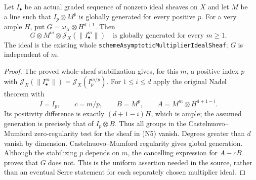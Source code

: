 \begin{corollary}
\label{cor:kn-nadel-asymptotic-uniform-generation}
\notready
Let $I_\bullet$ be an actual graded sequence of nonzero ideal sheaves
on $X$ and let $M$ be a line such that $I_p\otimes M^p$ is globally
generated for every positive $p$.  For a very ample $H$, put
$G=\omega_X\otimes H^{d+1}$.  Then
\[
 G\otimes M^m\otimes\mathcal J_X(\|I_\bullet^m\|)
 \quad\text{is globally generated for every }m\geq1.
 \tag{N5}
\]
The ideal is the existing whole
\texttt{schemeAsymptoticMultiplierIdealSheaf}; $G$ is independent
of $m$.
\end{corollary}
\begin{proof}
The proved whole-sheaf stabilization gives, for this $m$, a positive
index $p$ with
$\mathcal J_X(\|I_\bullet^m\|)=\mathcal J_X(I_p^{m/p})$.
For $1\leq i\leq d$ apply the original Nadel theorem with
\[
 I=I_p,\qquad c=m/p,\qquad B=M^p,\qquad
 A=M^m\otimes H^{d+1-i}.
\]
Its positivity difference is exactly $(d+1-i)H$, which is ample;
the assumed generation is precisely that of $I_p\otimes B$.
Thus all groups in the Castelnuovo--Mumford zero-regularity test
for the sheaf in (N5) vanish.  Degrees greater than $d$ vanish by
dimension.  Castelnuovo--Mumford regularity gives global generation.
Although the stabilizing $p$ depends on $m$, the cancelling expression
for $A-cB$ proves that $G$ does not.  This is the uniform assertion
needed in the source, rather than an eventual Serre statement for
each separately chosen multiplier ideal.
\end{proof}


